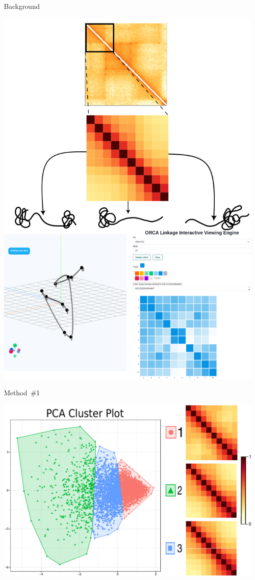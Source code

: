 \documentclass[landscape,a0paper,fontscale=0.285]{baposter} %
\begin{document}
\begin{poster}
\begin{posterbox}[name=section02, column=0, row=1, below=section01, height=0.5625, above=bottom]{Background}
\begin{center}
\includegraphics[width=0.8\linewidth, height=290\lineheight]{background.png}
\end{center}
\end{posterbox}


\begin{posterbox}[name=section03, column=1, height=0.333]{Method\ \#1}
\begin{center}
\includegraphics[width=0.9\linewidth, height=160\lineheight]{230902_Granta519cl27_24hdTAG_MYC5p_30mHyb_4phBl_30step_allfits_PCA_clusPlot_matrices.pdf}
\end{center}
\end{posterbox}


\end{poster}
\end{document}

